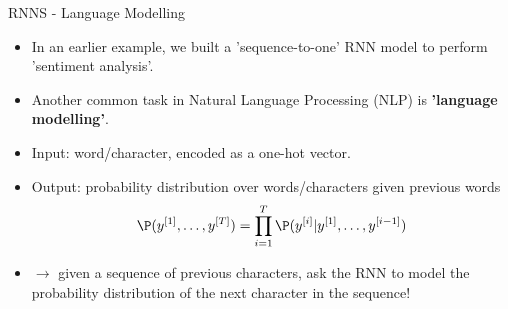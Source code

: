 \documentclass[11pt,compress,t,notes=noshow, xcolor=table]{beamer}
\begin{document}
\begin{vbframe}{RNNS - Language Modelling}
  \begin{itemize}
    \item In an earlier example, we built a 'sequence-to-one' RNN model to perform 'sentiment analysis'.
    \item Another common task in Natural Language Processing (NLP) is \textbf{'language modelling'}.
    \item Input: word/character, encoded as a one-hot vector.
    \item Output: probability distribution over words/characters given previous words $$\P(y^{[1]}, \dots, y^{[T]}) = \displaystyle \prod_{i=1}^{T} \P(y^{[i]}|y^{[1]}, \dots, y^{[i-1]})$$
    \item[] $\to$ given a sequence of previous characters, ask the RNN to model the probability distribution of the next character in the sequence!
   \end{itemize}
\end{vbframe}
\end{document}
